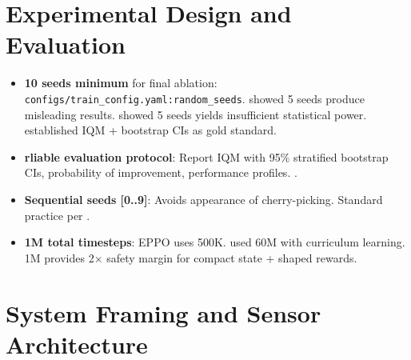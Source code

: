 \documentclass[11pt,a4paper]{article}
\begin{document}
\section{Experimental Design and Evaluation}

\begin{itemize}[leftmargin=*]
  \item \textbf{10 seeds minimum} for final ablation:
        \texttt{configs/train\_config.yaml:random\_seeds}.
        \cite{henderson2018deep} showed 5 seeds produce misleading results.
        \cite{colas2018many} showed 5 seeds yields insufficient statistical power.
        \cite{agarwal2021deep} established IQM + bootstrap CIs as gold standard.

  \item \textbf{rliable evaluation protocol}:
        Report IQM with 95\% stratified bootstrap CIs, probability of improvement,
        performance profiles. \cite{agarwal2021deep}.

  \item \textbf{Sequential seeds [0..9]}:
        Avoids appearance of cherry-picking. Standard practice per
        \cite{agarwal2021deep}.

  \item \textbf{1M total timesteps}:
        EPPO \cite{eppo2024} uses 500K. \cite{lazzaroni2024parking} used 60M
        with curriculum learning. 1M provides 2$\times$ safety margin for
        compact state + shaped rewards.
\end{itemize}

\section{System Framing and Sensor Architecture}
\end{document}
